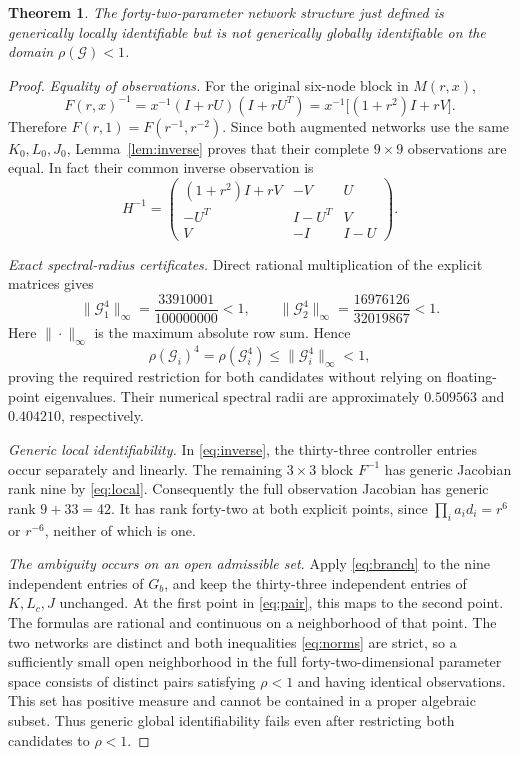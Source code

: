 \documentclass[11pt,a4paper]{article}
\newtheorem{theorem}{Theorem}
\begin{document}
\begin{theorem}\label{thm:main}
The forty-two-parameter network structure just defined is generically
locally identifiable but is not generically globally identifiable on the
domain $\rho(\mathcal G)<1$.
\end{theorem}
\begin{proof}
\emph{Equality of observations.}
For the original six-node block in $M(r,x)$,
\[
 F(r,x)^{-1}=x^{-1}(I+rU)(I+rU^T)
 =x^{-1}\big[(1+r^2)I+rV\big].
\]
Therefore $F(r,1)=F(r^{-1},r^{-2})$. Since both augmented networks use
the same $K_0,L_0,J_0$, Lemma~\ref{lem:inverse} proves that their complete
$9\times9$ observations are equal. In fact their common inverse observation is
\[
 H^{-1}=\begin{pmatrix}
 (1+r^2)I+rV&-V&U\\
 -U^T&I-U^T&V\\
 V&-I&I-U
 \end{pmatrix}.
\]

\emph{Exact spectral-radius certificates.}
Direct rational multiplication of the explicit matrices gives
\begin{equation}\label{eq:norms}
 \|\mathcal G_1^4\|_\infty=\frac{33910001}{100000000}<1,
 \qquad
 \|\mathcal G_2^4\|_\infty=\frac{16976126}{32019867}<1.
\end{equation}
Here $\|\cdot\|_\infty$ is the maximum absolute row sum. Hence
\[
 \rho(\mathcal G_i)^4=\rho(\mathcal G_i^4)
 \le\|\mathcal G_i^4\|_\infty<1,
\]
proving the required restriction for both candidates without relying on
floating-point eigenvalues. Their numerical spectral radii are approximately
$0.509563$ and $0.404210$, respectively.

\emph{Generic local identifiability.}
In \eqref{eq:inverse}, the thirty-three controller entries occur separately
and linearly. The remaining $3\times3$ block $F^{-1}$ has generic Jacobian
rank nine by \eqref{eq:local}. Consequently the full observation Jacobian
has generic rank $9+33=42$. It has rank forty-two at both explicit points,
since $\prod_i a_id_i=r^6$ or $r^{-6}$, neither of which is one.

\emph{The ambiguity occurs on an open admissible set.}
Apply \eqref{eq:branch} to the nine independent entries of $G_b$, and keep
the thirty-three independent entries of $K,L_c,J$ unchanged. At the first
point in \eqref{eq:pair}, this maps to the second point. The formulas are
rational and continuous on a neighborhood of that point. The two networks
are distinct and both inequalities \eqref{eq:norms} are strict, so a
sufficiently small open neighborhood in the full forty-two-dimensional
parameter space consists of distinct pairs satisfying $\rho<1$ and having
identical observations. This set has positive measure and cannot be
contained in a proper algebraic subset. Thus generic global identifiability
fails even after restricting both candidates to $\rho<1$.
\end{proof}
\end{document}
